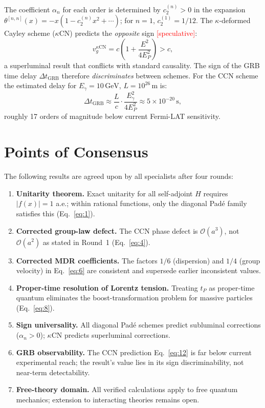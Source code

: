 \documentclass[11pt,a4paper]{article}
\begin{document}
The coefficient $\alpha_n$ for each order is determined by $c_2^{(n)} > 0$ in the expansion $\theta^{[n,n]}(x) = -x(1 - c_2^{(n)}x^2 + \cdots)$; for $n=1$, $c_2^{(1)} = 1/12$. The $\kappa$-deformed Cayley scheme ($\kappa$CN) predicts the \emph{opposite} sign \textcolor{red}{[speculative]}:
\begin{equation}
  v_g^{\kappa\mathrm{CN}} = c\!\left(1 + \frac{E^2}{4E_P^2}\right) > c,
  \label{eq:11}
\end{equation}
a superluminal result that conflicts with standard causality. The sign of the GRB time delay $\Delta t_{\mathrm{GRB}}$ therefore \emph{discriminates} between schemes. For the CCN scheme the estimated delay for $E_\gamma = 10\,\mathrm{GeV}$, $L = 10^{26}\,\mathrm{m}$ is:
\begin{equation}
  \Delta t_{\mathrm{GRB}} \approx \frac{L}{c}\cdot\frac{E_\gamma^2}{4E_P^2} \approx 5\times10^{-20}\,\mathrm{s},
  \label{eq:12}
\end{equation}
roughly 17 orders of magnitude below current Fermi-LAT sensitivity.

\section{Points of Consensus}

The following results are agreed upon by all specialists after four rounds:

\begin{enumerate}
  \item \textbf{Unitarity theorem.} Exact unitarity for all self-adjoint $H$ requires $|f(x)|=1$ a.e.; within rational functions, only the diagonal Pad\'{e} family satisfies this (Eq.~\eqref{eq:1}).
  \item \textbf{Corrected group-law defect.} The CCN phase defect is $\mathcal{O}(a^3)$, not $\mathcal{O}(a^2)$ as stated in Round~1 (Eq.~\eqref{eq:4}).
  \item \textbf{Corrected MDR coefficients.} The factors $1/6$ (dispersion) and $1/4$ (group velocity) in Eq.~\eqref{eq:6} are consistent and supersede earlier inconsistent values.
  \item \textbf{Proper-time resolution of Lorentz tension.} Treating $t_P$ as proper-time quantum eliminates the boost-transformation problem for massive particles (Eq.~\eqref{eq:8}).
  \item \textbf{Sign universality.} All diagonal Pad\'{e} schemes predict subluminal corrections ($\alpha_n > 0$); $\kappa$CN predicts superluminal corrections.
  \item \textbf{GRB observability.} The CCN prediction Eq.~\eqref{eq:12} is far below current experimental reach; the result's value lies in its sign discriminability, not near-term detectability.
  \item \textbf{Free-theory domain.} All verified calculations apply to free quantum mechanics; extension to interacting theories remains open.
\end{enumerate}
\end{document}
